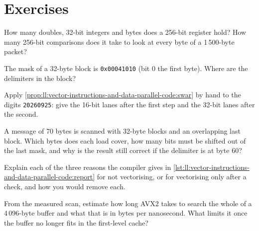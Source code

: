 \section{Exercises}

\begin{exercise}[$\star$]\label{exo:ll:vector-instructions-and-data-parallel-code:1}
How many doubles, 32-bit integers and bytes does a 256-bit register hold? How many 256-bit comparisons does it take to look
at every byte of a 1\,500-byte packet?
\end{exercise}

\begin{exercise}[$\star$]\label{exo:ll:vector-instructions-and-data-parallel-code:2}
The mask of a 32-byte block is \texttt{0x00041010} (bit 0 the first byte). Where are the delimiters in the block?
\end{exercise}

\begin{exercise}[$\star$]\label{exo:ll:vector-instructions-and-data-parallel-code:3}
Apply \cref{prop:ll:vector-instructions-and-data-parallel-code:swar} by hand to the digits \texttt{20260925}: give the
16-bit lanes after the first step and the 32-bit lanes after the second.
\end{exercise}

\begin{exercise}[$\star\star$]\label{exo:ll:vector-instructions-and-data-parallel-code:4}
A message of 70 bytes is scanned with 32-byte blocks and an overlapping last block. Which bytes does each load cover, how
many bits must be shifted out of the last mask, and why is the result still correct if the delimiter is at byte 60?
\end{exercise}

\begin{exercise}[$\star\star$]\label{exo:ll:vector-instructions-and-data-parallel-code:5}
Explain each of the three reasons the compiler gives in \cref{lst:ll:vector-instructions-and-data-parallel-code:report}
for not vectorising, or for vectorising only after a check, and how you would remove each.
\end{exercise}

\begin{exercise}[$\star\star$]\label{exo:ll:vector-instructions-and-data-parallel-code:6}
From the measured scan, estimate how long AVX2 takes to search the whole of a 4\,096-byte buffer and what that is in bytes
per nanosecond. What limits it once the buffer no longer fits in the first-level cache?
\end{exercise}

